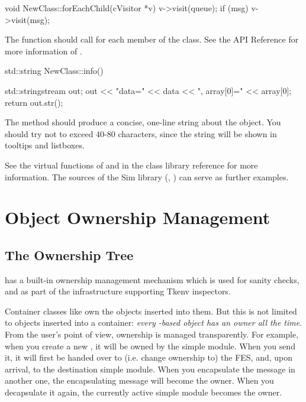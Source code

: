 \begin{cpp}
void NewClass::forEachChild(cVisitor *v)
{
    v->visit(queue);
    if (msg)
        v->visit(msg);
}
\end{cpp}

The  function should call 
for each  member of the class. See the API Reference for more
information of .

\begin{cpp}
std::string NewClass::info()
{
    std::stringstream out;
    out << "data=" << data << ", array[0]=" << array[0];
    return out.str();

}
\end{cpp}

The  method should produce a concise, one-line string
about the object. You should try not to exceed 40-80 characters, since the
string will be shown in tooltips and listboxes.

See the virtual functions of  and 
in the class library reference for more information. The sources of the
Sim library (, ) can serve as further examples.



\section{Object Ownership Management}
\label{sec:ch-sim-lib:ownership-management}

\subsection{The Ownership Tree}

{\opp} has a built-in ownership management mechanism which
is used for sanity checks, and as part of the infrastructure
supporting Tkenv inspectors.

Container classes like  own the objects inserted
into them. But this is not limited to objects inserted into a container:
\textit{every -based object has an owner all the time}.
From the user's point of view, ownership is managed transparently.
For example, when you create a new ,
it will be owned by the simple module. When you send it, it will
first be handed over to (i.e. change ownership to) the FES, and,
upon arrival, to the destination simple module. When you encapsulate
the message in another one, the encapsulating message will become
the owner. When you decapsulate it again, the currently active
simple module becomes the owner.

